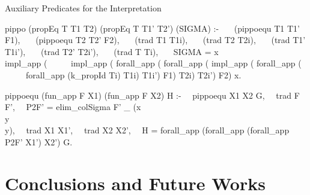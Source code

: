 \documentclass{beamer}
\begin{document}
\begin{frame}[fragile]{Auxiliary Predicates for the Interpretation}
\small\vspace{-0.2cm}
\begin{semiverbatim}
pippo (propEq T T1 T2) (propEq T T1' T2') (SIGMA) :- 
\ \ \ (pippoequ T1 T1' F1),
\ \ \ (pippoequ T2 T2' F2),
\ \ \ (trad T1 T1i),
\ \ \ (trad T2 T2i),
\ \ \ (trad T1' T1i'),
\ \ \ (trad T2' T2i'),
\ \ \ (trad T Ti),
\ \ \ SIGMA = x\\ impl_app ( 
\ \ \ \ \ impl_app ( forall_app ( forall_app ( impl_app ( forall_app ( 
\ \ \ \ \ forall_app (k_propId Ti) T1i) T1i') F1) T2i) T2i') F2)  x.
\end{semiverbatim}
\begin{semiverbatim}
	pippoequ (fun_app F X1) (fun_app F X2) H :-
	\ \ pippoequ X1 X2 G,
	\ \ trad F F',
	\ \ P2F' = elim_colSigma F' _ (x\\ y\\ y),
	\ \ trad X1 X1',
	\ \ trad X2 X2',
	\ \ H = forall_app (forall_app (forall_app P2F' X1') X2') G. 
\end{semiverbatim}
\end{frame}

\section[Conclusions]{Conclusions and Future Works}
\end{document}

